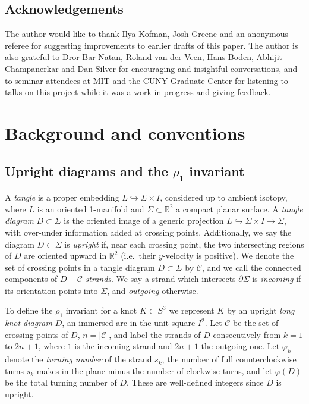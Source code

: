 \documentclass[11pt,hyp,]{nyjm}
\newcommand{\R}{\mathbb{R}}
\numberwithin{thm}{section}
\theoremstyle{definition}
\theoremstyle{remark}
\begin{document}
	\subsection{Acknowledgements}
	
	The author would like to thank Ilya Kofman, Josh Greene and an anonymous referee for suggesting improvements to earlier drafts of this paper. The author is also grateful to Dror Bar-Natan, Roland van der Veen, Hans Boden, Abhijit Champanerkar and Dan Silver for encouraging and insightful conversations, and to seminar attendees at MIT and the CUNY Graduate Center for listening to talks on this project while it was a work in progress and giving feedback.
	
	\section{Background and conventions}
	\label{sec:background}
	
	\subsection{Upright diagrams and the $\rho_1$ invariant}
	\label{sec:ud}
	
	A {\em tangle} is a proper embedding $L \hookrightarrow \Sigma \times I$, considered up to ambient isotopy, where $L$ is an oriented 1-manifold and $\Sigma \subset \R^2$ a compact planar surface. A {\em tangle diagram} $D \subset \Sigma$ is the oriented image of a generic projection $L \hookrightarrow \Sigma \times I \to \Sigma$, with over-under information added at crossing points. Additionally, we say the diagram $D \subset \Sigma$ is {\em upright} if, near each crossing point, the two intersecting regions of $D$ are oriented upward in $\R^2$ (i.e.~their $y$-velocity is positive). We denote the set of crossing points in a tangle diagram $D \subset \Sigma$ by $\mathcal{C}$, and we call the connected components of $D - \mathcal{C}$ {\em strands}. We say a strand which intersects $\partial \Sigma$ is {\em incoming} if its orientation points into $\Sigma$, and {\em outgoing} otherwise.
	
	To define the $\rho_1$ invariant for a knot $K \subset S^3$ we represent $K$ by an upright {\em long knot diagram} $D$, an immersed arc in the unit square $I^2$. Let $\mathcal{C}$ be the set of crossing points of $D$, $n = |\mathcal{C}|$, and label the strands of $D$ consecutively from $k = 1$ to $2n + 1$, where $1$ is the incoming strand and $2n + 1$ the outgoing one. Let $\varphi_k$ denote the {\em turning number} of the strand $s_k$, the number of full counterclockwise turns $s_k$ makes in the plane minus the number of clockwise turns, and let $\varphi(D)$ be the total turning number of $D$. These are well-defined integers since $D$ is upright.
	
\end{document}
